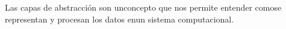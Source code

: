 \documentclass[preview]{standalone}
\begin{document}
\begin{center}
Las capas de abstracción son unconcepto que nos permite entender comose representan y procesan los datos enun sistema computacional.
\end{center}
\end{document}
